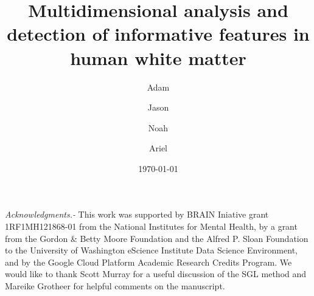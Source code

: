 \documentclass[10pt,%
               aps,%
               prl,%
               preprint,%
               superscriptaddress,%
               preprintnumbers,%
               amsmath,%
               floatfix,%
               endfloats*]{revtex4-1}
\begin{document}
\title{Multidimensional analysis and detection of informative features in human white matter}

\author{Adam }%
%

\author{Jason }%

\author{Noah }%

\author{Ariel }%

\date{\today}




\maketitle






\begin{acknowledgments}
    {\it Acknowledgments.-}
    This work was supported by BRAIN Iniative grant 1RF1MH121868-01 from the
    National Institutes for Mental Health, by a grant from the Gordon \& Betty
    Moore Foundation and the Alfred P. Sloan Foundation to the University of
    Washington eScience Institute Data Science Environment, and by the Google Cloud Platform Academic Research Credits Program.
    We would like to thank
    Scott Murray for a useful discussion of the SGL method and Mareike Grotheer for
    helpful comments on the manuscript.
\end{acknowledgments}

\printfigures



\end{document}
